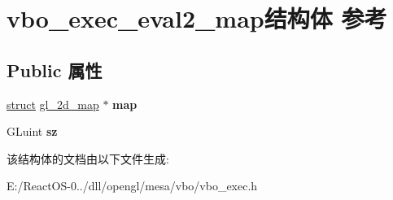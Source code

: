 \hypertarget{structvbo__exec__eval2__map}{}\section{vbo\+\_\+exec\+\_\+eval2\+\_\+map结构体 参考}
\label{structvbo__exec__eval2__map}
\subsection*{Public 属性}
\begin{DoxyCompactItemize}
\item 
\mbox{\label{structvbo__exec__eval2__map_a7df3b586f9f8294145b54703e39c2e5f}} 
\hyperlink{interfacestruct}{struct} \hyperlink{structgl__2d__map}{gl\+\_\+2d\+\_\+map} $\ast$ {\bfseries map}
\item 
\mbox{\label{structvbo__exec__eval2__map_a14da750e439c14cda5115ab9b60e53a9}} 
G\+Luint {\bfseries sz}
\end{DoxyCompactItemize}


该结构体的文档由以下文件生成\+:\begin{DoxyCompactItemize}
\item 
E\+:/\+React\+O\+S-\/0../dll/opengl/mesa/vbo/vbo\+\_\+exec.\+h\end{DoxyCompactItemize}
